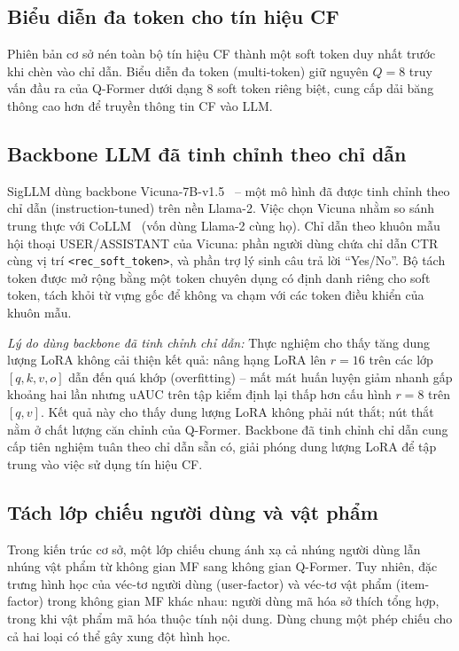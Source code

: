 \subsection{Biểu diễn đa token cho tín hiệu CF}
\label{ssec:da-token}

Phiên bản cơ sở nén toàn bộ tín hiệu CF thành một soft token duy nhất trước khi chèn vào
chỉ dẫn. Biểu diễn đa token (multi-token) giữ nguyên $Q = 8$ truy vấn đầu ra của Q-Former
dưới dạng $8$ soft token riêng biệt, cung cấp dải băng thông cao hơn để truyền thông tin
CF vào LLM.

\subsection{Backbone LLM đã tinh chỉnh theo chỉ dẫn}
\label{ssec:backbone-instruct}

SigLLM dùng backbone Vicuna-7B-v1.5~\cite{vicuna2023} -- một mô hình đã được tinh chỉnh
theo chỉ dẫn (instruction-tuned) trên nền Llama-2. Việc chọn Vicuna nhằm so sánh trung
thực với CoLLM~\cite{collm2023} (vốn dùng Llama-2 cùng họ). Chỉ dẫn theo khuôn mẫu hội
thoại USER/ASSISTANT của Vicuna: phần người dùng chứa chỉ dẫn CTR cùng vị trí
\verb|<rec_soft_token>|, và phần trợ lý sinh câu trả lời ``Yes/No''. Bộ tách token được
mở rộng bằng một token chuyên dụng có định danh riêng cho soft token, tách khỏi từ vựng
gốc để không va chạm với các token điều khiển của khuôn mẫu.

\textit{Lý do dùng backbone đã tinh chỉnh chỉ dẫn:} Thực nghiệm cho thấy tăng dung lượng
LoRA không cải thiện kết quả: nâng hạng LoRA lên $r = 16$ trên các lớp $[q,k,v,o]$ dẫn
đến quá khớp (overfitting) -- mất mát huấn luyện giảm nhanh gấp khoảng hai lần nhưng uAUC
trên tập kiểm định lại thấp hơn cấu hình $r = 8$ trên $[q,v]$. Kết quả này cho thấy dung
lượng LoRA không phải nút thắt; nút thắt nằm ở chất lượng căn chỉnh của Q-Former. Backbone
đã tinh chỉnh chỉ dẫn cung cấp tiên nghiệm tuân theo chỉ dẫn sẵn có, giải phóng dung lượng
LoRA để tập trung vào việc sử dụng tín hiệu CF.

\subsection{Tách lớp chiếu người dùng và vật phẩm}
\label{ssec:tach-projector}

Trong kiến trúc cơ sở, một lớp chiếu chung ánh xạ cả nhúng người dùng lẫn nhúng vật
phẩm từ không gian MF sang không gian Q-Former. Tuy nhiên, đặc trưng hình học của
véc-tơ người dùng (user-factor) và véc-tơ vật phẩm (item-factor) trong không gian MF
khác nhau: người dùng mã hóa sở thích tổng hợp, trong khi vật phẩm mã hóa thuộc tính
nội dung. Dùng chung một phép chiếu cho cả hai loại có thể gây xung đột hình học.

